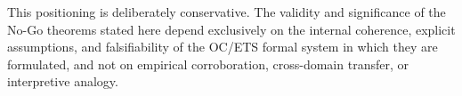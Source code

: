 \begin{remark}
This positioning is deliberately conservative. The validity and significance of
the No-Go theorems stated here depend exclusively on the internal coherence,
explicit assumptions, and falsifiability of the OC/ETS formal system in which
they are formulated, and not on empirical corroboration, cross-domain transfer,
or interpretive analogy.
\end{remark}
